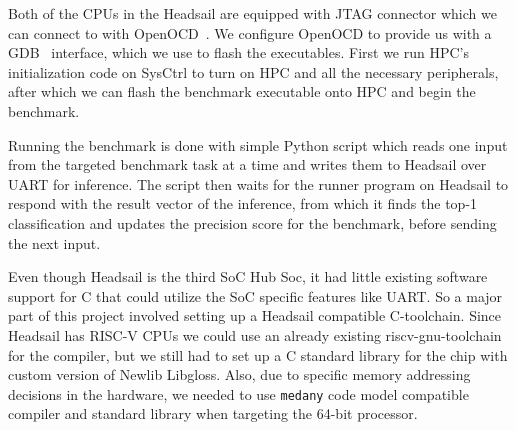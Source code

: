 \documentclass[12pt,a4paper,english
]{tunithesis}
\begin{document}
Both of the CPUs in the Headsail are equipped with JTAG connector which we can connect to with OpenOCD~\cite{openocd2023}. We configure OpenOCD to provide us with a GDB~\cite{gdb2023} interface, which we use to flash the executables. First we run HPC's initialization code on SysCtrl to turn on HPC and all the necessary peripherals, after which we can flash the benchmark executable onto HPC and begin the benchmark.

Running the benchmark is done with simple Python script which reads one input from the targeted benchmark task at a time and writes them to Headsail over UART for inference.
The script then waits for the runner program on Headsail to respond with the result vector of the inference, from which it finds the top-1 classification and updates the precision score for the benchmark, before sending the next input.

Even though Headsail is the third SoC Hub Soc, it had little existing software support for C that could utilize the SoC specific features like UART. So a major part of this project involved setting up a Headsail compatible C-toolchain. Since Headsail has RISC-V CPUs we could use an already existing riscv-gnu-toolchain for the compiler, but we still had to set up a C standard library for the chip with custom version of Newlib Libgloss. Also, due to specific memory addressing decisions in the hardware, we needed to use \texttt{medany} code model compatible compiler and standard library when targeting the 64-bit processor.
\end{document}
